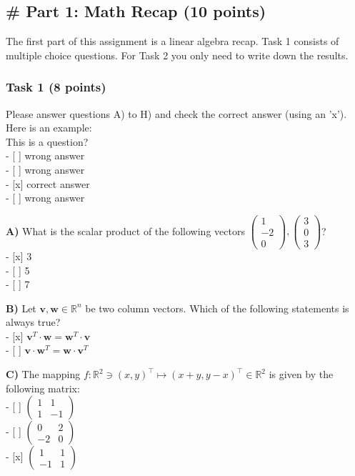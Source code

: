 \documentclass[11pt]{article}
\begin{document}
    \subsection{\# Part 1: Math Recap (10
points)}\label{part-1-math-recap-10-points}

The first part of this assignment is a linear algebra recap. Task 1
consists of multiple choice questions. For Task 2 you only need to write
down the results.

    \subsubsection{Task 1 (8 points)}\label{task-1-8-points}

Please answer questions A) to H) and check the correct answer (using an
'x'). Here is an example:\\
This is a question?\\
- {[} {]} wrong answer\\
- {[} {]} wrong answer\\
- {[}x{]} correct answer\\
- {[} {]} wrong answer

    \textbf{A)} What is the scalar product of the following vectors
\(\left( \begin{array}{r} 1 \\ -2 \\ 0 \end{array} \right) , \left( \begin{array}{r} 3 \\ 0 \\ 3 \end{array} \right)\)?\\
- {[}x{]} 3\\
- {[} {]} 5\\
- {[} {]} 7

    \textbf{B)} Let \(\mathbf{v}, \mathbf{w} \in \mathbb{R}^n\) be two
column vectors. Which of the following statements is always true?\\
- {[}x{]}
\(\mathbf{v}^T \cdot \mathbf{w} = \mathbf{w}^T \cdot \mathbf{v}\)\\
- {[} {]}
\(\mathbf{v} \cdot \mathbf{w}^T = \mathbf{w} \cdot \mathbf{v}^T\)

    \textbf{C)} The mapping
\(f: \mathbb{R}^2 \ni (x, y)^\top \mapsto (x + y, y- x)^\top \in \mathbb{R}^2\)
is given by the following matrix:\\
- {[} {]}
\(\left( \begin{array}{rr} 1 & 1 \\ 1& -1 \end{array} \right)\)\\
- {[} {]}
\(\left( \begin{array}{rr} 0 & 2 \\ -2& 0 \end{array} \right)\)\\
- {[}x{]}
\(\left( \begin{array}{rr} 1 & 1 \\ -1& 1 \end{array} \right)\)
\end{document}
